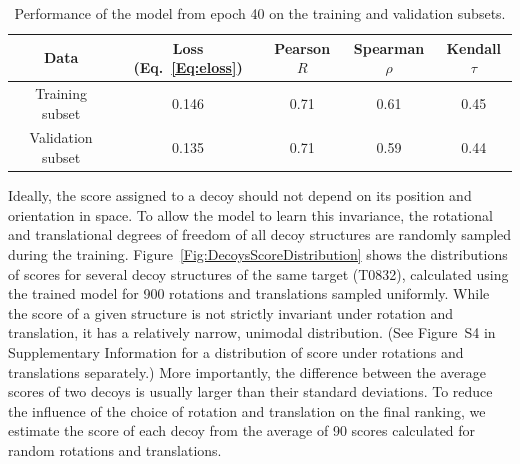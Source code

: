 \documentclass{bioinfo}
\begin{document}
\begin{table}[!t]
  \centering
  \caption {Performance of the model from epoch 40 on the training and
    validation subsets.}
\begin{tabular}{ c c c c c }
    Data & Loss (Eq.~\ref{Eq:eloss}) & Pearson $R$ & Spearman $\rho$ & Kendall $\tau$ \\
    \hline
    Training subset     &0.146 &0.71 &0.61 &0.45 \\
    Validation subset   &0.135 &0.71 &0.59 &0.44 \\ \hline
\end{tabular}
\label{Tbl:TrainingResults}
\end{table}
Ideally, the score assigned to a decoy should not depend on its
position and orientation in space. To allow the model to learn this
invariance, the rotational and translational degrees of freedom of all
decoy structures are randomly sampled during the training.
Figure~\ref{Fig:DecoysScoreDistribution} shows the distributions of
scores for several decoy structures of the same target (T0832),
calculated using the trained model for 900 rotations and translations
sampled uniformly.  While the score of a given structure is not
strictly invariant under rotation and translation, it has a relatively
narrow, unimodal distribution.  (See Figure~S4 in Supplementary
Information for a distribution of score under rotations and
translations separately.)  More importantly, the difference between
the average scores of two decoys is usually larger than their
standard deviations.
To reduce the influence of the choice of rotation and translation on
the final ranking, we estimate the score of each decoy from the
average of 90 scores calculated for random rotations and translations.

\end{document}
